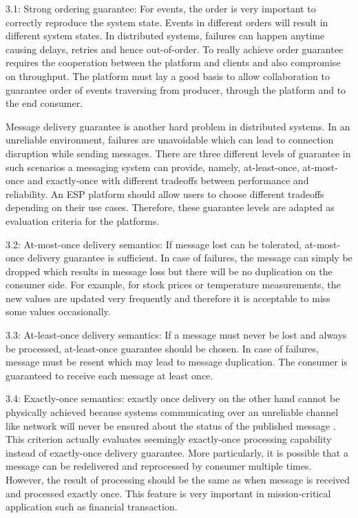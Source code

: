 3.1: Strong ordering guarantee: For events, the order is very important to correctly reproduce the system state. Events in different orders will result in different system states. In distributed systems, failures can happen anytime causing delays, retries and hence out-of-order. To really achieve order guarantee requires the cooperation between the platform and clients and also compromise on throughput. The platform must lay a good basis to allow collaboration to guarantee order of events traversing from producer, through the platform and to the end consumer.

Message delivery guarantee is another hard problem in distributed systems. In an unreliable environment, failures are unavoidable which can lead to connection disruption while sending messages. There are three different levels of guarantee in such scenarios a messaging system can provide, namely, at-least-once, at-most-once and exactly-once with different tradeoffs between performance and reliability. An ESP platform should allow users to choose different tradeoffs depending on their use cases. Therefore, these guarantee levels are adapted as evaluation criteria for the platforms.

3.2: At-most-once delivery semantics: If message lost can be tolerated, at-most-once delivery guarantee is sufficient. In case of failures, the message can simply be dropped which results in message loss but there will be no duplication on the consumer side. For example, for stock prices or temperature measurements, the new values are updated very frequently and therefore it is acceptable to miss some values occasionally. 

3.3: At-least-once delivery semantics: If a message must never be lost and always be processed, at-least-once guarantee should be chosen. In case of failures, message must be resent which may lead to message duplication. The consumer is guaranteed to receive each message at least once. 

3.4: Exactly-once semantics: exactly once delivery on the other hand cannot be physically achieved because systems communicating over an unreliable channel like network will never be ensured about the status of the published message \cite{exactlyoncenotpossible}. This criterion actually evaluates seemingly exactly-once processing capability instead of exactly-once delivery guarantee. More particularly, it is possible that a message can be redelivered and reprocessed by consumer multiple times. However, the result of processing should be the same as when message is received and processed exactly once. This feature is very important in mission-critical application such as financial transaction.

